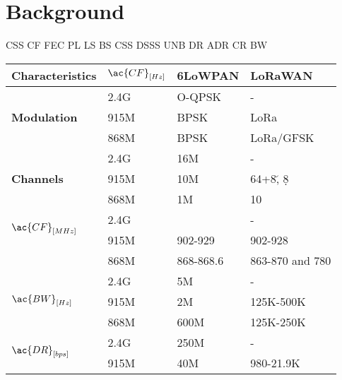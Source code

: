 \section{Background} \label{sec:Background}

\ac{CSS} \ac{CF} \ac{FEC}  \ac{PL} \ac{LS} \ac{BS} \ac{CSS} \ac{DSSS} \ac{UNB} \ac{DR} \ac{ADR} \ac{CR} \ac{BW}

\begin{tabular}{l|l|l|l}
	\bf{Characteristics}               & $\ac{CF}_{[Hz]}$ & \bf{6LoWPAN} & \bf{LoRaWAN}     \\\hline
	\multirow{3}{*}{\bf{Modulation}}   & 2.4G             & O-QPSK       & -                \\
	\                                  & 915M             & BPSK         & LoRa             \\
	\                                  & 868M             & BPSK         & LoRa/GFSK        \\\hline
	\multirow{3}{*}{\bf{Channels}}     & 2.4G             & 16M          & -                \\
	\                                  & 915M             & 10M          & 64+8\u, 8\d      \\
	\                                  & 868M             & 1M           & 10               \\\hline
	\multirow{2}{*}{$\ac{CF}_{[MHz]}$} & 2.4G             & \ko          & -                \\
	\                                  & 915M             & 902-929      & 902-928          \\
	\                                  & 868M             & 868-868.6    & 863-870 and 780  \\\hline
	\multirow{3}{*}{$\ac{BW}_{[Hz]}$}  & 2.4G             & 5M           & -                \\
	\                                  & 915M             & 2M           & 125K-500K        \\
	\                                  & 868M             & 600M         & 125K-250K        \\\hline
	\multirow{3}{*}{$\ac{DR}_{[bps]}$} & 2.4G             & 250M         & -                \\
	\                                  & 915M             & 40M          & 980-21.9K        \\

\end{tabular}
